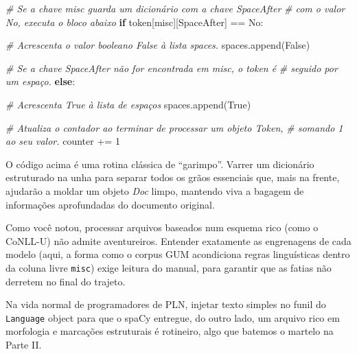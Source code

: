\documentclass[
  brazilian,
]{article}
\newenvironment{Shaded}{}{}
\newcommand{\CommentTok}[1]{\textcolor[rgb]{0.38,0.63,0.69}{\textit{#1}}}
\newcommand{\ControlFlowTok}[1]{\textcolor[rgb]{0.00,0.44,0.13}{\textbf{#1}}}
\newcommand{\DecValTok}[1]{\textcolor[rgb]{0.25,0.63,0.44}{#1}}
\newcommand{\NormalTok}[1]{#1}
\newcommand{\OperatorTok}[1]{\textcolor[rgb]{0.40,0.40,0.40}{#1}}
\newcommand{\StringTok}[1]{\textcolor[rgb]{0.25,0.44,0.63}{#1}}
\newcommand{\VariableTok}[1]{\textcolor[rgb]{0.10,0.09,0.49}{#1}}
\begin{document}
\begin{Shaded}
\begin{Highlighting}[]
            \CommentTok{\# Se a chave \textquotesingle{}misc\textquotesingle{} guarda um dicionário com a chave \textquotesingle{}SpaceAfter\textquotesingle{}}
            \CommentTok{\# com o valor \textquotesingle{}No\textquotesingle{}, executa o bloco abaixo}
            \ControlFlowTok{if}\NormalTok{ token[}\StringTok{\textquotesingle{}misc\textquotesingle{}}\NormalTok{][}\StringTok{\textquotesingle{}SpaceAfter\textquotesingle{}}\NormalTok{] }\OperatorTok{==} \StringTok{\textquotesingle{}No\textquotesingle{}}\NormalTok{:}
                
                \CommentTok{\# Acrescenta o valor booleano False à lista \textquotesingle{}spaces\textquotesingle{}.}
\NormalTok{                spaces.append(}\VariableTok{False}\NormalTok{)}
            
        \CommentTok{\# Se a chave \textquotesingle{}SpaceAfter\textquotesingle{} não for encontrada em \textquotesingle{}misc\textquotesingle{}, o token é}
        \CommentTok{\# seguido por um espaço.}
        \ControlFlowTok{else}\NormalTok{:}

            \CommentTok{\# Acrescenta True à lista de espaços}
\NormalTok{            spaces.append(}\VariableTok{True}\NormalTok{)}
        
        \CommentTok{\# Atualiza o contador ao terminar de processar um objeto Token,}
        \CommentTok{\# somando 1 ao seu valor.}
\NormalTok{        counter }\OperatorTok{+=} \DecValTok{1}
\end{Highlighting}
\end{Shaded}

O código acima é uma rotina clássica de ``garimpo''. Varrer um
dicionário estruturado na unha para separar todos os grãos essenciais
que, mais na frente, ajudarão a moldar um objeto \emph{Doc} limpo,
mantendo viva a bagagem de informações aprofundadas do documento
original.

Como você notou, processar arquivos baseados num esquema rico (como o
CoNLL-U) não admite aventureiros. Entender exatamente as engrenagens de
cada modelo (aqui, a forma como o corpus GUM acondiciona regras
linguísticas dentro da coluna livre \texttt{misc}) exige leitura do
manual, para garantir que as fatias não derretem no final do trajeto.

Na vida normal de programadores de PLN, injetar texto simples no funil
do \texttt{Language} object para que o spaCy entregue, do outro lado, um
arquivo rico em morfologia e marcações estruturais é rotineiro, algo que
batemos o martelo na Parte II.
\end{document}
